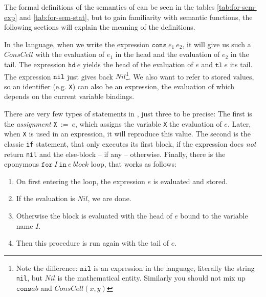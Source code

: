 The formal definitions of the semantics of \FOR can be seen in the tables 
\ref{tab:for-sem-exp} and \ref{tab:for-sem-stat}, but to gain familiarity 
with semantic functions, the following sections will explain the meaning of 
the definitions.

In the \FOR language, when we write the expression $\mathtt{cons}\: e_1\: e_2$, it
will give us such a $ConsCell$ with the evaluation of $e_1$ in the head and the
evaluation of $e_2$ in the tail. The expression $\mathtt{hd}\: e$ yields the head of
the evaluation of $e$ and $\mathtt{tl}\: e$ its tail. The expression 
$\mathtt{nil}$ just gives back $Nil$\footnote{
	Note the difference: $\mathtt{nil}$ is an expression in the language,
	literally the string {\tt nil}, but $Nil $ is the mathematical entity.
	Similarly you should not mix up $\mathtt{cons} a b$ and $ConsCell(x, y)$}.
We also want to refer to stored values, so an identifier (e.g. {\tt X}) can
also be an expression, the evaluation of which depends on the current variable
bindings.

There are very few types of statements in \FOR, just three to be precise: The 
first is the \emph{assignment} $\mathtt{X}\:\mathtt{:=}\: e$, which assigns the variable {\tt X}
the evaluation of $e$. Later, when {\tt X} is used in an expression, it 
will reproduce this value. The second is the classic {\tt if} statement, that 
only executes its first block, if the expression does \emph{not} return {\tt nil} 
and the else-block -- if any -- otherwise. Finally, there is the eponymous 
$\mathtt{for}\: I\: \mathtt{in}\: e\: block$ loop, that works as follows:

\begin{enumerate}
	\item On first entering the loop, the expression $e$ is evaluated and stored.
	\item If the evaluation is $Nil$, we are done.
	\item Otherwise the block is evaluated with the head of $e$ bound to the 
		variable name $I$.
	\item Then this procedure is run again with the tail of $e$.
\end{enumerate}

